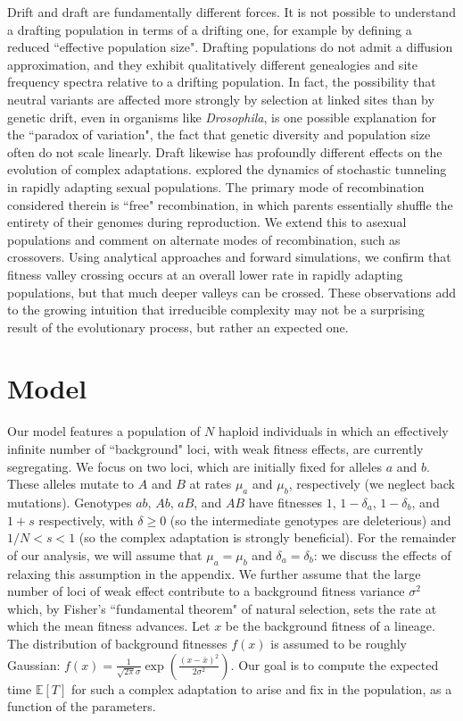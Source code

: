 \documentclass[rmp]{revtex4}
\begin{document}
Drift and draft are fundamentally different forces.
It is not possible to understand a drafting population in terms of a drifting one, for example by defining a reduced ``effective population size".
Drafting populations do not admit a diffusion approximation, and they exhibit qualitatively different genealogies and site frequency spectra relative to a drifting population.
In fact, the possibility that neutral variants are affected more strongly by selection at linked sites than by genetic drift, even in organisms like \emph{Drosophila}, is one possible explanation for the ``paradox of variation", the fact that genetic diversity and population size often do not scale linearly.
Draft likewise has profoundly different effects on the evolution of complex adaptations.
\citet{neher_shraiman_2011} explored the dynamics of stochastic tunneling in rapidly adapting sexual populations.
The primary mode of recombination considered therein is ``free" recombination, in which parents essentially shuffle the entirety of their genomes during reproduction.
We extend this to asexual populations and comment on alternate modes of recombination, such as crossovers.
Using analytical approaches and forward simulations, we confirm that fitness valley crossing occurs at an overall lower rate in rapidly adapting populations, but that much deeper valleys can be crossed.
These observations add to the growing intuition that irreducible complexity may not be a surprising result of the evolutionary process, but rather an expected one.

\section*{Model}

Our model features a population of $N$ haploid individuals in which an effectively infinite number of ``background" loci, with weak fitness effects, are currently segregating.
We focus on two loci, which are initially fixed for alleles $a$ and $b$.
These alleles mutate to $A$ and $B$ at rates $\mu_a$ and $\mu_b$, respectively (we neglect back mutations).
Genotypes $ab$, $Ab$, $aB$, and $AB$ have fitnesses $1$, $1-\delta_a$, $1-\delta_b$, and $1+s$ respectively, with $\delta \geq 0$ (so the intermediate genotypes are deleterious) and $1/N < s < 1$ (so the complex adaptation is strongly beneficial).
For the remainder of our analysis, we will assume that $\mu_a = \mu_b$ and $\delta_a = \delta_b$: we discuss the effects of relaxing this assumption in the appendix.
We further assume that the large number of loci of weak effect contribute to a background fitness variance $\sigma^2$ which, by Fisher's ``fundamental theorem" of natural selection, sets the rate at which the mean fitness advances.
Let $x$ be the background fitness of a lineage.
The distribution of background fitnesses $f(x)$ is assumed to be roughly Gaussian: $f(x) = \frac{1}{\sqrt{2\pi}\sigma} \exp (\frac{(x-\bar{x})^2}{2\sigma^2})$.
Our goal is to compute the expected time $\mathbb{E}\left[ T\right]$ for such a complex adaptation to arise and fix in the population, as a function of the parameters.
\end{document}

